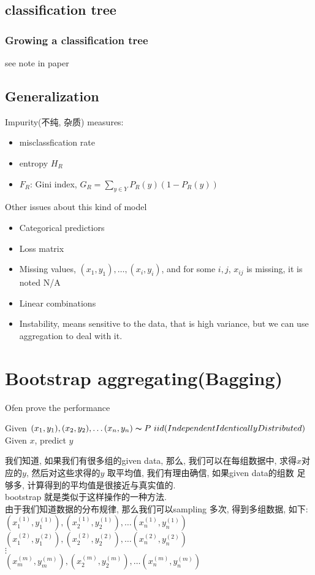 \documentclass{article}
\begin{document}
\subsection{classification tree}
\subsubsection{Growing a classification tree}
see note in paper

\subsection{Generalization}
Impurity(不纯, 杂质) measures:
\begin{itemize}
\item misclassfication rate
\item entropy $H_R$
\item $F_R$: Gini index, $G_R = \sum_{y \in Y} P_R(y)(1 - P_R(y))$
\end{itemize}

Other issues about this kind of model
\begin{itemize}
\item Categorical predictiors
\item Loss matrix
\item Missing values, $(x_1, y_1), \ldots, (x_i, y_i)$, and for some $i,j$, $x_{ij}$ is missing, it is noted N/A
\item Linear combinations
\item Instability, means sensitive to the data, that is high variance, but we can use aggregation to deal with it.
\end{itemize}

\section{Bootstrap aggregating(Bagging)}
Ofen prove the performance

\noindent
Given $(x_1, y_1), (x_2, y_2), \ldots (x_n, y_n) \thicksim{P} \ iid(Independent Identically Distributed)$\\
Given $x$, predict $y$

我们知道, 如果我们有很多组的given data, 那么, 我们可以在每组数据中, 求得$x$对应的$y$, 然后对这些求得的$y$ 取平均值, 我们有理由确信, 如果given data的组数
足够多, 计算得到的平均值是很接近与真实值的.\\
bootstrap 就是类似于这样操作的一种方法.\\
由于我们知道数据的分布规律, 那么我们可以sampling 多次, 得到多组数据, 如下:\\
$(x_1^{(1)}, y_1^{(1)}), (x_2^{(1)}, y_2^{(1)}), \ldots (x_n^{(1)}, y_n^{(1)})$ \\
$(x_1^{(2)}, y_1^{(2)}), (x_2^{(2)}, y_2^{(2)}), \ldots (x_n^{(2)}, y_n^{(2)})$ \\
$\vdots$\\
$(x_m^{(m)}, y_m^{(m)}), (x_2^{(m)}, y_2^{(m)}), \ldots (x_n^{(m)}, y_n^{(m)})$ \\
\end{document}
